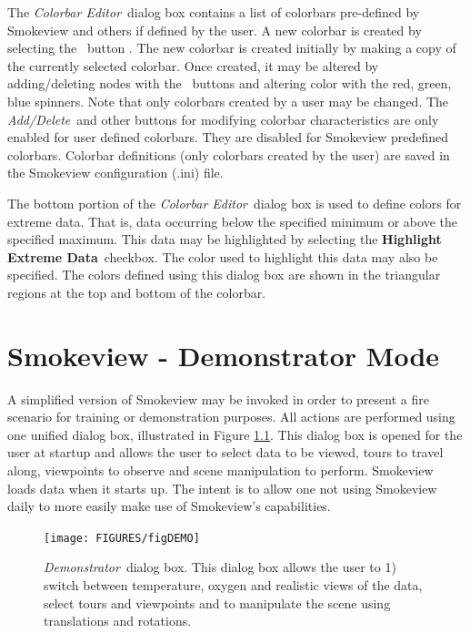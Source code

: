 \documentclass[11pt,twoside]{book}
\newcommand{\frameit}[1]{\fbox{\tt #1}}
\begin{document}
The {\em Colorbar Editor}\ dialog box contains a list of colorbars
pre-defined by Smokeview and others if defined by the user. A new
colorbar is created by selecting the \frameit{New}\ button . The
new colorbar is created initially by making a copy of the
currently selected colorbar. Once created, it may be altered by
adding/deleting nodes with the \frameit{Add/Delete}\ buttons and
altering color with the red, green, blue spinners. Note that only
colorbars created by a user may be changed. The {\em Add/Delete}\
and other buttons for modifying colorbar characteristics are only
enabled for user defined colorbars.  They are disabled for
Smokeview predefined colorbars. Colorbar definitions (only
colorbars created by the user) are saved in the Smokeview
configuration (.ini) file.

The bottom portion of the {\em Colorbar Editor}\ dialog box is
used to define colors for extreme data.  That is, data occurring
below the specified minimum or above the specified maximum.  This
data may be highlighted by selecting the {\bf Highlight Extreme
Data}\ checkbox. The color used to highlight this data may also be
specified.  The colors defined using this dialog box are shown in
the triangular regions at the top and bottom of the colorbar.

\chapter{Smokeview - Demonstrator Mode}
A simplified version of Smokeview may be invoked in order to present a fire
scenario for training or demonstration
purposes.  All actions are performed using one unified dialog box,
illustrated in Figure \ref{figDEMO}.  This dialog box is opened for the
user at startup and allows the user to select data to be viewed, tours to
travel along, viewpoints to observe and scene manipulation to perform.
Smokeview loads data when it starts up.
The intent is to allow one not using Smokeview daily to more easily
make use of Smokeview's capabilities.


\begin{figure}[\figoptions]
\begin{center}
\texttt{[image: FIGURES/figDEMO]}
\end{center}
\caption[{\em Demonstrator}\ dialog box.]{{\em Demonstrator}\ dialog box.
This dialog box allows the user to 1) switch between temperature, oxygen and realistic views of the data,
select tours and viewpoints
 and to manipulate the scene using translations and rotations.} \label{figDEMO}
\end{figure}
\end{document}
